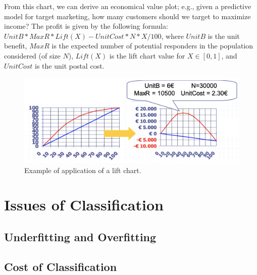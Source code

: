 From this chart, we can derive an economical value plot; e.g., given a predictive model for target marketing, how many customers should we target to maximize income? The profit is given by the following formula: $UnitB * MaxR * Lift(X) - UnitCost*N*X/100$, where $UnitB$ is the unit benefit, $MaxR$ is the expected number of potential responders in the population considered (of size $N$), $Lift(X)$ is the lift chart value for $X \in [0,1]$, and $UnitCost$ is the unit postal cost.

\begin{figure}
    \centering
    \includegraphics[width=0.5\linewidth]{img/Lift chart application.png}
    \caption{Example of application of a lift chart.}
\end{figure}


\section{Issues of Classification}

\subsection{Underfitting and Overfitting}




\subsection{Cost of Classification}